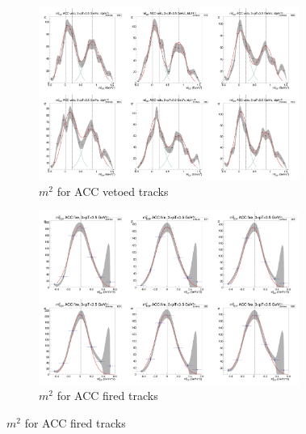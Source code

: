 \begin{figure}[H]
  \ContinuedFloat
    \begin{subfigure}{1\textwidth}
   \centering
   \includegraphics[width=0.94\textwidth]{hiptfits/pos/PSm2_cent0_ich1_accfire0_ptbin12.jpg}
    \caption{$m^2$ for ACC vetoed tracks}
    \end{subfigure}
    \begin{subfigure}{1\textwidth}
   \centering
   \includegraphics[width=0.94\textwidth]{hiptfits/pos/PSm2_cent0_ich1_accfire1_ptbin12.jpg}
    \caption{$m^2$ for ACC fired tracks}
    \end{subfigure}  
\end{figure}
